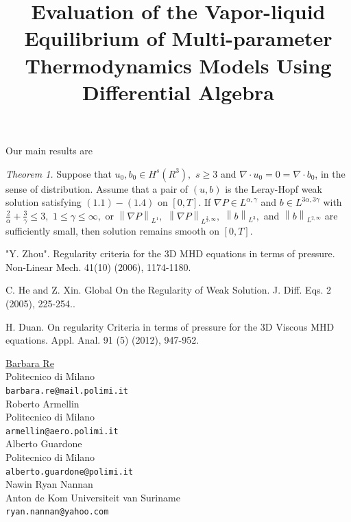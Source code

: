 \documentclass[article, A4, 11pt]{llncs}%
\begin{document}
Our main results are

\textit{Theorem 1.} Suppose  that $u_{0},b_{0}\in H^{s}(R^{3}),$ $s\geq 3$ and $\nabla \cdot u_{0}=0=\nabla \cdot b_{0}$, in the sense of distribution. Assume that a pair of $(u,b)$ is the Leray-Hopf weak solution satisfying $(1.1)-(1.4)$ on $[0,T].$ If $ \nabla P\in L^{\alpha, \gamma}$ and $b\in L^{3\alpha, 3\gamma}$ with $\frac {2} {\alpha}+\frac {3}{\gamma}\leq 3,$
$1\leq \gamma\leq\infty,$ or $\left\|\nabla P\right\|_{L^ {1}},$ $\left\|\nabla P\right\|_{L^ {\frac{2}{3},\infty}},$ $\left\|b\right\|_{L^ {3}},$ and $\left\|b\right\|_{L^ {2,\infty}}$ are sufficiently small, then solution remains smooth on $[0,T].$



\begin{thebibliography}{10}
{\sc "Y. Zhou"}. { Regularity criteria for the 3D MHD equations in terms of pressure}. Non-Linear Mech. 41(10) (2006), 1174-1180.

{\sc C. He and Z. Xin}. {Global On the Regularity of Weak Solution}. J. Diff. Eqs. 2 (2005), 225-254..

{\sc H. Duan}. {On regularity Criteria in terms of pressure for the 3D Viscous MHD equations}. Appl. Anal. 91 (5) (2012), 947-952.
\end{thebibliography} %

\title{Evaluation of the Vapor-liquid Equilibrium of Multi-parameter Thermodynamics Models Using Differential Algebra}
 \author{} \institute{}
\maketitle
\begin{center}
{\large \underline{Barbara Re}}\\
Politecnico di Milano\\
{\tt barbara.re@mail.polimi.it}
\\ \vspace{4mm}
{\large Roberto Armellin}\\
Politecnico di Milano\\
{\tt armellin@aero.polimi.it}
\\ \vspace{4mm}
{\large Alberto Guardone}\\
Politecnico di Milano\\
{\tt alberto.guardone@polimi.it}
\\ \vspace{4mm}
{\large Nawin Ryan Nannan}\\
Anton de Kom Universiteit van Suriname\\
{\tt ryan.nannan@yahoo.com}
\end{center}
\end{document}

